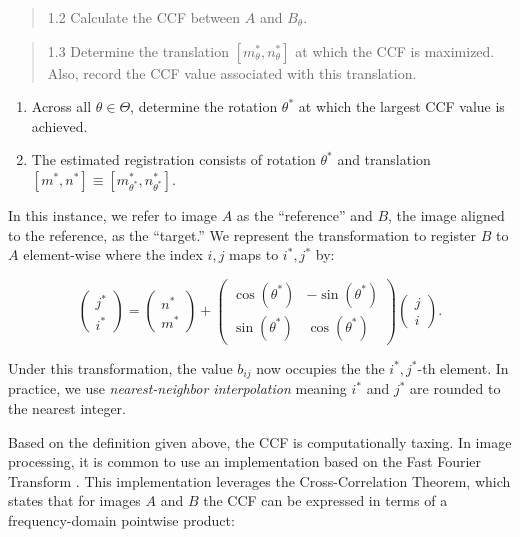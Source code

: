 \documentclass[11pt,]{isuthesis}
\begin{document}
\begin{quote}
1.2 Calculate the CCF between \(A\) and \(B_\theta\).
\end{quote}

\begin{quote}
1.3 Determine the translation \([m_{\theta}^*,n_{\theta}^*]\) at which the CCF is maximized. Also, record the CCF value associated with this translation.
\end{quote}

\begin{enumerate}
\def\labelenumi{\arabic{enumi}.}
\setcounter{enumi}{1}
\item
  Across all \(\theta \in \Theta\), determine the rotation \(\theta^*\) at which the largest CCF value is achieved.
\item
  The estimated registration consists of rotation \(\theta^*\) and translation \([m^*,n^*] \equiv [m_{\theta^*}^*,n_{\theta^*}^*]\).
\end{enumerate}

In this instance, we refer to image \(A\) as the ``reference'' and \(B\), the image aligned to the reference, as the ``target.''
We represent the transformation to register \(B\) to \(A\) element-wise where the index \(i,j\) maps to \(i^*,j^*\) by:

\[
\begin{pmatrix} j^* \\ i^* \end{pmatrix} = \begin{pmatrix} n^* \\ m^* \end{pmatrix} + \begin{pmatrix} \cos(\theta^*) & -\sin(\theta^*) \\ \sin(\theta^*) & \cos(\theta^*) \end{pmatrix} \begin{pmatrix} j \\ i \end{pmatrix}.
\]

Under this transformation, the value \(b_{ij}\) now occupies the the \(i^*,j^*\)-th element.
In practice, we use \emph{nearest-neighbor interpolation} meaning \(i^*\) and \(j^*\) are rounded to the nearest integer.

Based on the definition given above, the CCF is computationally taxing.
In image processing, it is common to use an implementation based on the Fast Fourier Transform \citep{Brown1992}.
This implementation leverages the Cross-Correlation Theorem, which states that for images \(A\) and \(B\) the CCF can be expressed in terms of a frequency-domain pointwise product:
\end{document}
